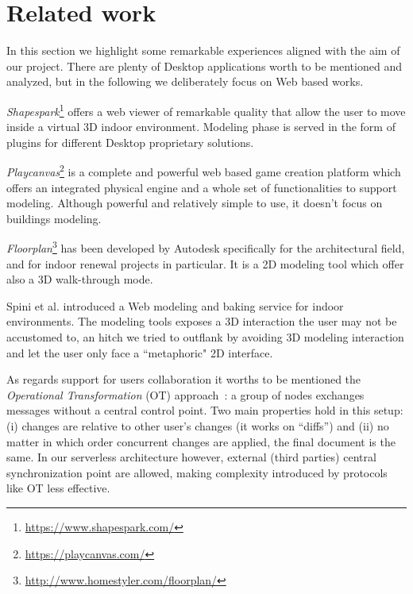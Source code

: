\section{Related work}\label{sec:related_work}

In this section we highlight some remarkable experiences aligned with the aim of our project. There are plenty of Desktop applications worth to be mentioned and analyzed, but in the following we deliberately focus on Web based works. 

\emph{Shapespark}\footnote{\url{https://www.shapespark.com/}} offers a web viewer of remarkable quality that allow the user to move inside a virtual 3D indoor environment. Modeling phase is served in the form of plugins for different Desktop proprietary solutions.

\emph{Playcanvas}\footnote{\url{https://playcanvas.com/}} is a complete and powerful web based game creation platform which offers an integrated physical engine and a whole set of functionalities to support modeling. Although powerful and relatively simple to use, it doesn't focus on buildings modeling.

\emph{Floorplan}\footnote{\url{http://www.homestyler.com/floorplan/}} has been developed by Autodesk specifically for the architectural field, and for indoor renewal projects in particular. It is a 2D modeling tool which offer also a 3D walk-through mode.

Spini et al. \cite{Spini:2016:WIA:2945292.2945309} introduced a Web modeling and baking service for indoor environments. The modeling tools exposes a 3D interaction the user may not be accustomed to, an hitch we tried to outflank by avoiding 3D modeling interaction and let the user only face a ``metaphoric" 2D interface.

As regards support for users collaboration it worths to be mentioned the \emph{Operational Transformation} (OT) approach~\cite{Ellis:1989:CCG:66926.66963}: a group of nodes exchanges messages without a central control point. Two main properties hold in this setup: (i) changes are relative to other user's changes (it works on ``diffs'') and (ii) no matter in which order concurrent changes are applied, the final document is the same. In our serverless architecture however, external (third parties) central synchronization point are allowed, making complexity introduced by protocols like OT less effective.